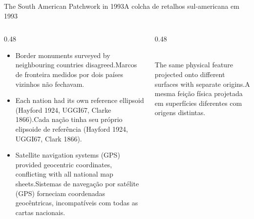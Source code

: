 \documentclass[aspectratio=169,11pt]{beamer}
\newcommand{\tr}[2]{\ifEN#2\else#1\fi}
\begin{document}
\begin{frame}{\tr{A colcha de retalhos sul-americana em 1993}{The South American Patchwork in 1993}}
  \begin{columns}[onlytextwidth]
    \begin{column}{0.48\textwidth}
      \begin{tcolorbox}[colback=mRose!8, colframe=mRose, title={\tr{Problemas na fronteira}{Border issues}}]
        \scriptsize
        \begin{itemize}
          \setlength{\itemsep}{3pt}
          \item \tr{Marcos de fronteira medidos por dois países vizinhos não fechavam.}{Border
                monuments surveyed by neighbouring countries disagreed.}
          \item \tr{Cada nação tinha seu próprio elipsoide de referência (Hayford 1924, UGGI67,
                Clark 1866).}{Each nation had its own reference ellipsoid (Hayford 1924, UGGI67,
                Clarke 1866).}
          \item \tr{Sistemas de navegação por satélite (GPS) forneciam coordenadas geocêntricas,
                incompatíveis com todas as cartas nacionais.}{Satellite navigation systems (GPS)
                provided geocentric coordinates, conflicting with all national map sheets.}
        \end{itemize}
      \end{tcolorbox}
    \end{column}
    \begin{column}{0.48\textwidth}
      \centering
      \\[4pt]
      \tiny \tr{A mesma feição física projetada em superfícies diferentes com origens distintas.}{The
      same physical feature projected onto different surfaces with separate origins.}
    \end{column}
  \end{columns}
\end{frame}
\end{document}
